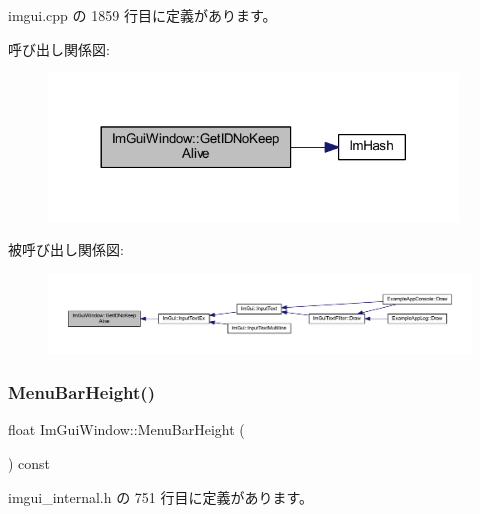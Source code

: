  imgui.\+cpp の 1859 行目に定義があります。

呼び出し関係図\+:\nopagebreak
\begin{figure}[H]
\begin{center}
\leavevmode
\includegraphics[width=308pt]{struct_im_gui_window_adc0a43f74a0b53a15a4bc4fea05524fe_cgraph}
\end{center}
\end{figure}
被呼び出し関係図\+:\nopagebreak
\begin{figure}[H]
\begin{center}
\leavevmode
\includegraphics[width=350pt]{struct_im_gui_window_adc0a43f74a0b53a15a4bc4fea05524fe_icgraph}
\end{center}
\end{figure}
\mbox{\label{struct_im_gui_window_acfb8bdad2e3ea6102589813ae32d0364}} 
\subsubsection{\texorpdfstring{Menu\+Bar\+Height()}{MenuBarHeight()}}
{\footnotesize\ttfamily float Im\+Gui\+Window\+::\+Menu\+Bar\+Height (\begin{DoxyParamCaption}{ }\end{DoxyParamCaption}) const\hspace{0.3cm}{\ttfamily [inline]}}



 imgui\+\_\+internal.\+h の 751 行目に定義があります。

